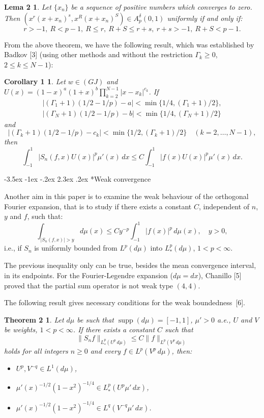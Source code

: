 \documentclass[11pt,a4paper]{article}
\makeatletter
\newcommand{\supp}{\operatorname{supp}}
\renewcommand\section{\@startsection {section}{1}{\z@}%
                                   {-3.5ex \@plus -1ex \@minus -.2ex}%
                                   {2.3ex \@plus.2ex}%
                                   {\centering \normalfont\large\bfseries}}
\theoremstyle{plain}
\newtheorem*{lemTwo}{Lema 2}
\newtheorem*{theoTwo}{Theorem 2}
\newtheorem*{corOne}{Corollary 1}
\theoremstyle{definition}
\theoremstyle{remark}
\makeatother
\begin{document}
\begin{lemTwo}
Let $\{x_{n}\}$ be a sequence of positive numbers which 
converges to zero. Then
$(x^{r}(x+x_{n})^{s},x^{R}(x+x_{n})^{S}) \in A_{p}^{\delta}(0,1)$ 
uniformly if and only if:
$$
r > -1,\ R < p-1,\ R \leq r,\ R+S \leq r+s,\ r+s > -1,\ R+S < p-1.
$$
\end{lemTwo}

From the above theorem, we have the following result, which was 
established by Badkov [3] (using other methods and without the 
restriction $\Gamma_{k} \geq 0$, $2 \leq k \leq N-1$):

\begin{corOne}
Let $w \in (GJ)$ and
$U(x) = (1-x)^{a}(1+x)^{b} \prod_{k=2}^{N-1} |x-x_{k}|^{c_{k}}$. 
If
\begin{align*}
|(\Gamma_{1}+1) (1/2-1/p) - a| < \min\{1/4,(\Gamma_{1}+1)/2\},\\
|(\Gamma_{N}+1) (1/2-1/p) - b| < \min\{1/4,(\Gamma_{N}+1)/2\}
\end{align*}
and
$$
|(\Gamma_{k}+1) (1/2-1/p) - c_{k}| < \min\{1/2,(\Gamma_{k}+1)/2\}
\quad (k = 2,\dots ,N-1),
$$
then
$$
\int_{-1}^{1} |S_{n}(f,x)U(x)|^{p}\mu'(x)\,dx 
\leq C \int_{-1}^{1} |f(x)U(x)|^{p}\mu'(x)\,dx.
$$
\end{corOne}


\section*{Weak convergence}

Another aim in this paper is to examine the weak behaviour of 
the orthogonal Fourier expansion, that is to study if there exists 
a constant $C$, independent of $n$, $y$ and $f$, such that:
$$
\int_{|S_{n}(f,x)|>y} d\mu(x)
\leq Cy^{-p} \int_{-1}^{1} |f(x)|^{p}\,d\mu(x), 
\quad y > 0,
$$
i.e., if $S_{n}$ is uniformly bounded from $L^{p}(d\mu)$ into 
$L^{p}_{*}(d\mu)$, $1 < p < \infty$.

The previous inequality only can be true, besides the mean convergence 
interval, in its endpoints. For the Fourier-Legendre expansion 
($d\mu = dx$), Chanillo [5] proved that the partial sum operator 
is not weak type $(4,4)$.

The following result gives necessary conditions for the weak 
boundedness~[6].

\begin{theoTwo}
Let $d\mu$ be such that $\supp(d\mu) = [-1,1]$, 
$\mu' > 0$ a.e., $U$ and $V$ be weights, $1 < p < \infty$. 
If there exists a constant $C$ such that
$$
\|S_{n}f\|_{L^{p}_{*}(U^{p}\,d\mu)} \leq C\|f\|_{L^{p}(V^{p}\,d\mu)}
$$
holds for all integers $n \geq 0$ and every $f \in L^{p}(V^{p}\,d\mu)$, 
then:
\begin{itemize}
\item[(i)] $U^{p}, V^{-q} \in L^{1}(d\mu)$,
\item[(ii)] $\mu'(x)^{-1/2}(1-x^{2})^{-1/4} \in L^{p}_{*}(U^{p}\mu'\,dx)$,
\item[(iii)] $\mu'(x)^{-1/2}(1-x^{2})^{-1/4} \in L^{q}(V^{-q}\mu'\,dx)$.
\end{itemize}
\end{theoTwo}
\end{document}
